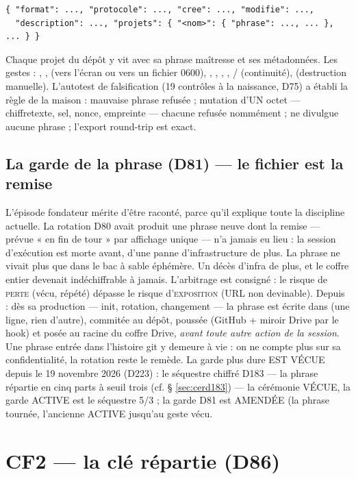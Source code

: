 \begin{lstlisting}
{ "format": ..., "protocole": ..., "cree": ..., "modifie": ...,
  "description": ..., "projets": { "<nom>": { "phrase": ..., ... }, ... } }
\end{lstlisting}

Chaque projet du dépôt y vit avec sa phrase maîtresse et ses métadonnées. Les gestes :
, ,  (vers l'écran ou vers un fichier 0600),
, , , ,
/ (continuité),  (destruction manuelle).
L'autotest de falsification (19 contrôles à la naissance, D75) a établi la règle de la
maison : mauvaise phrase refusée ; mutation d'UN octet — chiffretexte, sel, nonce,
empreinte — chacune refusée nommément ;  ne divulgue aucune phrase ;
l'export round-trip est exact.

\subsection{La garde de la phrase (D81) — le fichier est la remise}

L'épisode fondateur mérite d'être raconté, parce qu'il explique toute la discipline
actuelle. La rotation D80 avait produit une phrase neuve dont la remise — prévue « en
fin de tour » par affichage unique — n'a jamais eu lieu : la session d'exécution est
morte avant, d'une panne d'infrastructure de plus. La phrase ne vivait plus que dans le
bac à sable éphémère. Un décès d'infra de plus, et le coffre entier devenait
indéchiffrable à jamais. L'arbitrage est consigné : le risque de \textsc{perte} (vécu,
répété) dépasse le risque d'\textsc{exposition} (URL non devinable). Depuis : dès sa
production — init, rotation, changement — la phrase est écrite dans
 (une ligne, rien d'autre), commitée au dépôt, poussée
(GitHub + miroir Drive par le hook) et posée au racine du coffre Drive, \emph{avant
toute autre action de la session}. Une phrase entrée dans l'histoire git y demeure à
vie : on ne compte plus sur sa confidentialité, la rotation reste le remède.
La garde plus dure EST VÉCUE depuis le 19 novembre 2026 (D223) : le
séquestre chiffré D183 — la phrase répartie en cinq parts à seuil trois
(cf. § \ref{sec:cerd183}) — la cérémonie VÉCUE, la garde ACTIVE est le
séquestre 5/3 ; la garde D81 est AMENDÉE (la phrase tournée, l'ancienne
ACTIVE jusqu'au geste vécu.

\section{CF2 — la clé répartie (D86)}\label{sec:cf2}

